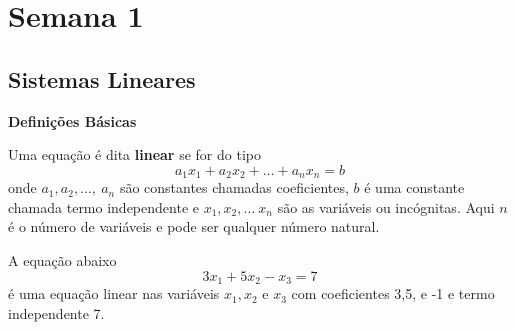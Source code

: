 

\providecommand{\dir}{..}


%




\chapter{Semana 1}

\section{Sistemas Lineares}

{\bf Definições Básicas}

\bigskip

\begin{defn} Uma equação é dita {\bf linear } se for do tipo
\[
a_1 x_1 + a_2 x_2 + \hdots + a_n x_n = b
\]
onde $a_1, a_2 , \hdots, \ a_n$ são constantes chamadas coeficientes, $b$ é uma constante chamada termo independente e $x_1, x_2 , \hdots \ x_n$ são as variáveis ou incógnitas. Aqui $n$ é o  número de variáveis e pode ser qualquer número natural.
\end{defn}

\bigskip

\begin{ex}
A equação abaixo
\[
3 x_1 + 5 x_2 - x_3 = 7
\] é uma equação linear nas variáveis $x_1, x_2$ e $x_3$ com coeficientes 3,5, e -1 e termo independente 7.
\end{ex}


